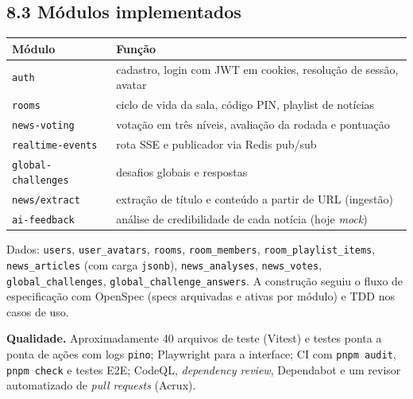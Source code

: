 \documentclass[
  brazilian,
  11pt,
]{article}
\newcounter{none} %
\begin{document}
\subsection{8.3 Módulos implementados}\label{muxf3dulos-implementados}

{\def\LTcaptype{none} %
\begin{longtable}[]{@{}
  >{\raggedright\arraybackslash}p{}
  >{\raggedright\arraybackslash}p{}@{}}
\toprule\noalign{}
\begin{minipage}[b]{\linewidth}\raggedright
Módulo
\end{minipage} & \begin{minipage}[b]{\linewidth}\raggedright
Função
\end{minipage} \\
\midrule\noalign{}
\endhead
\bottomrule\noalign{}
\endlastfoot
\texttt{auth} & cadastro, login com JWT em cookies, resolução de sessão, avatar \\
\texttt{rooms} & ciclo de vida da sala, código PIN, playlist de notícias \\
\texttt{news-voting} & votação em três níveis, avaliação da rodada e pontuação \\
\texttt{realtime-events} & rota SSE e publicador via Redis pub/sub \\
\texttt{global-challenges} & desafios globais e respostas \\
\texttt{news/extract} & extração de título e conteúdo a partir de URL (ingestão) \\
\texttt{ai-feedback} & análise de credibilidade de cada notícia (hoje \emph{mock}) \\
\end{longtable}
}

Dados: \texttt{users}, \texttt{user\_avatars}, \texttt{rooms}, \texttt{room\_members}, \texttt{room\_playlist\_items}, \texttt{news\_articles} (com carga \texttt{jsonb}), \texttt{news\_analyses}, \texttt{news\_votes}, \texttt{global\_challenges}, \texttt{global\_challenge\_answers}. A construção seguiu o fluxo de especificação com OpenSpec (specs arquivadas e ativas por módulo) e TDD nos casos de uso.

\textbf{Qualidade.} Aproximadamente 40 arquivos de teste (Vitest) e testes ponta a ponta de ações com logs \texttt{pino}; Playwright para a interface; CI com \texttt{pnpm\ audit}, \texttt{pnpm\ check} e testes E2E; CodeQL, \emph{dependency review}, Dependabot e um revisor automatizado de \emph{pull requests} (Acrux).
\end{document}
